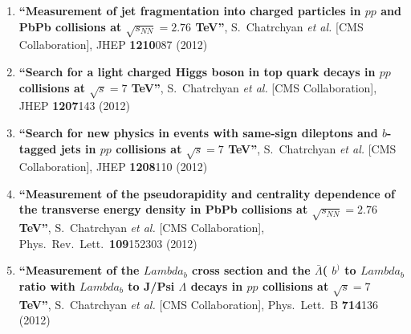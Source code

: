\begin{enumerate}
\item%
{\bf ``Measurement of jet fragmentation into charged particles in $pp$ and PbPb collisions at $\sqrt{s_{NN}}=2.76$ TeV''}, 
  S.~Chatrchyan {\it et al.}  [CMS Collaboration], 
JHEP {\bf 1210}087 (2012) %


\item%
{\bf ``Search for a light charged Higgs boson in top quark decays in $pp$ collisions at $\sqrt{s}=7$ TeV''}, 
  S.~Chatrchyan {\it et al.}  [CMS Collaboration], 
JHEP {\bf 1207}143 (2012) %


\item%
{\bf ``Search for new physics in events with same-sign dileptons and $b$-tagged jets in $pp$ collisions at $\sqrt{s}=7$ TeV''}, 
  S.~Chatrchyan {\it et al.}  [CMS Collaboration], 
JHEP {\bf 1208}110 (2012) %


\item%
{\bf ``Measurement of the pseudorapidity and centrality dependence of the transverse energy density in PbPb collisions at $\sqrt{s_{NN}}=2.76$ TeV''}, 
  S.~Chatrchyan {\it et al.}  [CMS Collaboration], 
Phys.\ Rev.\ Lett.\  {\bf 109}152303 (2012) %


\item%
{\bf ``Measurement of the $Lambda_b$ cross section and the $\bar{\Lambda}$( $b^{)}$ to $Lambda_b$ ratio with $Lambda_b$ to J/Psi $\Lambda$ decays in $pp$ collisions at $\sqrt{s}=7$ TeV''}, 
  S.~Chatrchyan {\it et al.}  [CMS Collaboration], 
Phys.\ Lett.\ B {\bf 714}136 (2012) %



\end{enumerate}
